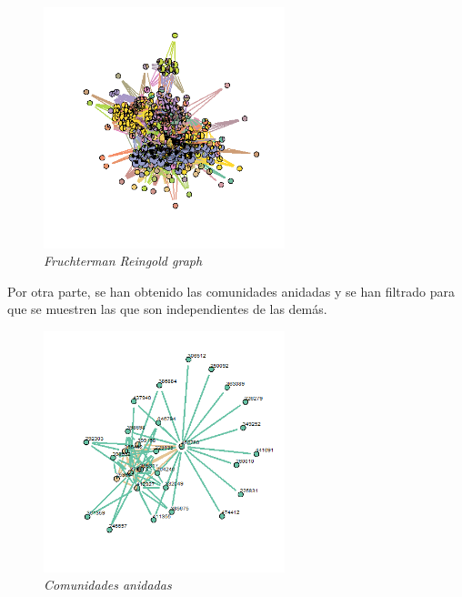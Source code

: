 \begin{figure}
	\centering
	\includegraphics[width=70mm,scale=1.2]{figures/hits.network_layout_fruchterman.reingold_shownodesin_10.png}
	\caption{\textit{Fruchterman Reingold graph}}
\end{figure}

Por otra parte, se han obtenido las comunidades anidadas y se han filtrado para que se muestren las que son independientes de las demás.

 \begin{figure}
 	\centering
 	\includegraphics[width=70mm,scale=1.2]{figures/nested_comm.png}
 	\caption{\textit{Comunidades anidadas}}
 \end{figure}